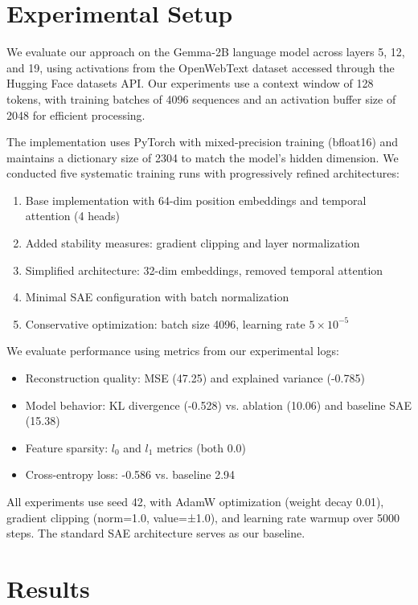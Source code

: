 \section{Experimental Setup}
We evaluate our approach on the Gemma-2B language model across layers 5, 12, and 19, using activations from the OpenWebText dataset accessed through the Hugging Face datasets API. Our experiments use a context window of 128 tokens, with training batches of 4096 sequences and an activation buffer size of 2048 for efficient processing.

The implementation uses PyTorch with mixed-precision training (bfloat16) and maintains a dictionary size of 2304 to match the model's hidden dimension. We conducted five systematic training runs with progressively refined architectures:

\begin{enumerate}
    \item Base implementation with 64-dim position embeddings and temporal attention (4 heads)
    \item Added stability measures: gradient clipping and layer normalization
    \item Simplified architecture: 32-dim embeddings, removed temporal attention
    \item Minimal SAE configuration with batch normalization
    \item Conservative optimization: batch size 4096, learning rate $5\times10^{-5}$
\end{enumerate}

We evaluate performance using metrics from our experimental logs:
\begin{itemize}
    \item Reconstruction quality: MSE (47.25) and explained variance (-0.785)
    \item Model behavior: KL divergence (-0.528) vs. ablation (10.06) and baseline SAE (15.38)
    \item Feature sparsity: $l_0$ and $l_1$ metrics (both 0.0)
    \item Cross-entropy loss: -0.586 vs. baseline 2.94
\end{itemize}

All experiments use seed 42, with AdamW optimization (weight decay 0.01), gradient clipping (norm=1.0, value=±1.0), and learning rate warmup over 5000 steps. The standard SAE architecture serves as our baseline.

\section{Results}

